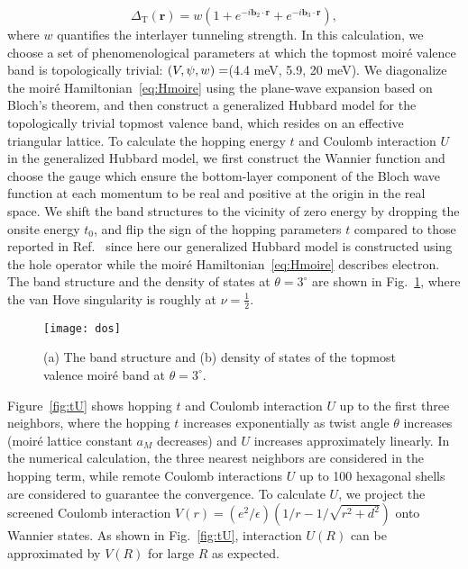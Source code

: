 \documentclass[aps,prl,floatfix,twocolumn]{revtex4-1}
\begin{document}
\begin{equation}
	\Delta_{\text{T}}(\bm{r}) = w (1+e^{-i \bm{b}_2 \cdot \bm{r}}+e^{-i \bm{b}_3 \cdot \bm{r}}),
\end{equation}
where $ w $ quantifies the interlayer tunneling strength. In this calculation, we choose a set of phenomenological parameters at which the topmost moir\'e valence band is topologically trivial: $ \qty(V,\psi,w)= $(4.4 meV, 5.9, 20 meV). %
We diagonalize the moir\'e Hamiltonian~\eqref{eq:Hmoire} using the plane-wave expansion based on Bloch's theorem, and then construct a generalized Hubbard model for the topologically trivial topmost valence band, which resides on an effective triangular lattice. To calculate the hopping energy $ t $ and Coulomb interaction $ U $ in the generalized Hubbard model, we first construct the Wannier function and choose the gauge which ensure the bottom-layer component of the Bloch wave function at each momentum to be real and positive at the origin in the real space. We shift the band structures to the vicinity of zero energy by dropping the onsite energy $ t_0 $, and flip the sign of the hopping parameters $t$ compared to those reported in Ref.~\cite{pan2020band}  since here our generalized Hubbard model is constructed using the hole operator while the moir\'e Hamiltonian~\eqref{eq:Hmoire} describes electron. The band structure and the density of states at $ \theta=3^\circ $ are shown in Fig.~\ref{fig:dos}, where the van Hove singularity is roughly at $ \nu=\frac{1}{2} $.

\begin{figure}[t]
	\centering
	\texttt{[image: dos]}
	\caption{(a) The band structure and (b) density of states of the topmost valence moir\'e band at $ \theta=3^\circ $.}
	\label{fig:dos}
\end{figure}

Figure~\ref{fig:tU} shows hopping $ t $  and Coulomb interaction $ U $ up to the first three neighbors, where the hopping $ t $ increases exponentially as twist angle $ \theta $ increases (moir\'e lattice constant $ a_M $ decreases) and $ U $ increases approximately linearly. In the numerical calculation, the three nearest neighbors are considered in the hopping term, while remote Coulomb interactions $ U $ up to 100 hexagonal shells are considered to guarantee the convergence. To calculate $U$, we project the screened Coulomb interaction $V(r)=(e^2/\epsilon)(1/r-1/\sqrt{r^2+d^2})$ onto Wannier states.  As shown in Fig.~\ref{fig:tU}, interaction $U(R)$ can be approximated by $V(R)$ for large $R$ as expected.
\end{document}
